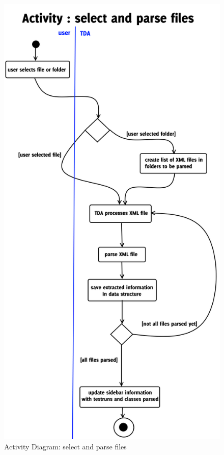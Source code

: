 \begin{figure}[h]
\begin{center}
\includegraphics[scale=0.27]{pics/activityDiagramSelectAndParseFiles.png}
\caption{Activity Diagram: select and parse files} 
\label{AD-SaP}
\end{center}
\end{figure}
